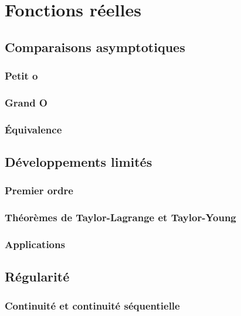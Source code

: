 
\chapter{Fonctions réelles}
\label{chap:3}


\section{Comparaisons asymptotiques}

\subsection{Petit o}

\subsection{Grand O}

\subsection{Équivalence}

\section{Développements limités}

\subsection{Premier ordre}

\subsection{Théorèmes de Taylor-Lagrange et Taylor-Young}

\subsection{Applications}

\section{Régularité}

\subsection{Continuité et continuité séquentielle}

